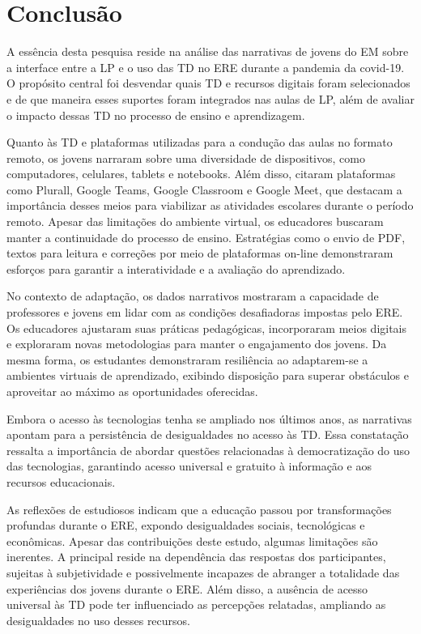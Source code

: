 \documentclass[portuguese]{textolivre}
\begin{document}
\section{Conclusão}\label{sec-titulo}
A essência desta pesquisa reside na análise das narrativas de jovens do EM sobre a interface entre a LP e o uso das TD no ERE durante a pandemia da covid-19. O propósito central foi desvendar quais TD e recursos digitais foram selecionados e de que maneira esses suportes foram integrados nas aulas de LP, além de avaliar o impacto dessas TD no processo de ensino e aprendizagem.

Quanto às TD e plataformas utilizadas para a condução das aulas no formato remoto, os jovens narraram sobre uma diversidade de dispositivos, como computadores, celulares, tablets e notebooks. Além disso, citaram plataformas como Plurall, Google Teams, Google Classroom e Google Meet, que destacam a importância desses meios para viabilizar as atividades escolares durante o período remoto. Apesar das limitações do ambiente virtual, os educadores buscaram manter a continuidade do processo de ensino. Estratégias como o envio de PDF, textos para leitura e correções por meio de plataformas on-line demonstraram esforços para garantir a interatividade e a avaliação do aprendizado.

No contexto de adaptação, os dados narrativos mostraram a capacidade de professores e jovens em lidar com as condições desafiadoras impostas pelo ERE. Os educadores ajustaram suas práticas pedagógicas, incorporaram meios digitais e exploraram novas metodologias para manter o engajamento dos jovens. Da mesma forma, os estudantes demonstraram resiliência ao adaptarem-se a ambientes virtuais de aprendizado, exibindo disposição para superar obstáculos e aproveitar ao máximo as oportunidades oferecidas.

Embora o acesso às tecnologias tenha se ampliado nos últimos anos, as narrativas apontam para a persistência de desigualdades no acesso às TD. Essa constatação ressalta a importância de abordar questões relacionadas à democratização do uso das tecnologias, garantindo acesso universal e gratuito à informação e aos recursos educacionais.

As reflexões de estudiosos indicam que a educação passou por transformações profundas durante o ERE, expondo desigualdades sociais, tecnológicas e econômicas. Apesar das contribuições deste estudo, algumas limitações são inerentes. A principal reside na dependência das respostas dos participantes, sujeitas à subjetividade e possivelmente incapazes de abranger a totalidade das experiências dos jovens durante o ERE. Além disso, a ausência de acesso universal às TD pode ter influenciado as percepções relatadas, ampliando as desigualdades no uso desses recursos.
\end{document}
